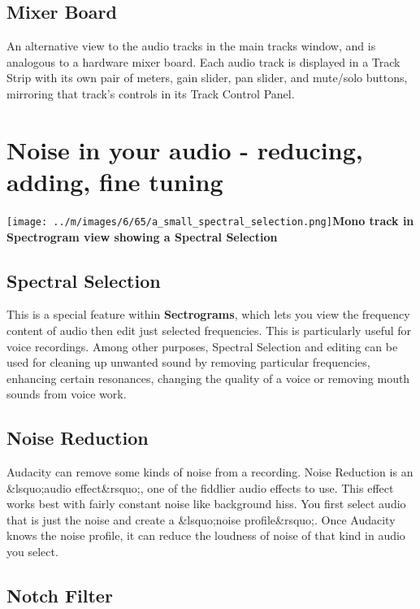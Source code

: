 \documentclass[twocolumn]{book}
\begin{document}
\subsection{Mixer Board}


An alternative view to the audio tracks in the main tracks window, and is analogous to a hardware mixer board. Each audio track is displayed in a Track Strip with its own pair of meters, gain slider, pan slider, and mute/solo buttons, mirroring that track's controls in its Track Control Panel. 



\section{Noise in your audio - reducing, adding, fine tuning}

\texttt{[image: ../m/images/6/65/a\_small\_spectral\_selection.png]}\textbf{Mono track in Spectrogram view showing a Spectral Selection}

\subsection{Spectral Selection}


This is a special feature within \textbf{Sectrograms}, which lets you view the frequency content of audio then edit just selected frequencies.  This is particularly useful for voice recordings.  Among other purposes, Spectral Selection and editing can be used for cleaning up unwanted sound by removing particular frequencies, enhancing certain resonances, changing the quality of a voice or removing mouth sounds from voice work.

\subsection{Noise Reduction}


Audacity can remove some kinds of noise from a recording.  Noise Reduction is an \&lsquo;audio effect\&rsquo;, one of the fiddlier audio effects to use.  This effect works best with fairly constant noise like background hiss.  You first select audio that is just the noise and create a \&lsquo;noise profile\&rsquo;.  Once Audacity knows the noise profile, it can reduce the loudness of noise of that kind in audio you select. 

\subsection{Notch Filter}
\end{document}
